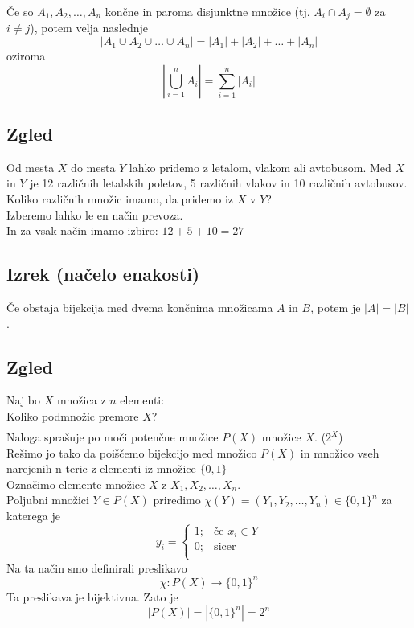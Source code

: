 \documentclass[12pt]{article}
\begin{document}
\noindent
Če so $A_1, A_2, \dots, A_n$ končne in paroma disjunktne množice (tj. $A_i \cap A_j = \emptyset$ za $i \ne j$), potem velja naslednje
$$
|A_1 \cup A_2 \cup \dots \cup A_n| = |A_1| + |A_2| + \dots + |A_n|
$$
oziroma
$$
\left| \bigcup_{i = 1}^n A_i \right| = \sum_{i = 1}^n |A_i|
$$


\subsection{Zgled}
Od mesta $X$ do mesta $Y$ lahko pridemo z letalom, vlakom ali avtobusom. Med $X$ in $Y$ je 12 različnih letalskih poletov, 5 različnih vlakov in 10 različnih avtobusov. Koliko različnih množic imamo, da pridemo iz $X$ v $Y$? \\

\noindent
Izberemo lahko le en način prevoza. \\
In za vsak način imamo izbiro: $12 + 5 + 10 = 27$



\subsection{Izrek (načelo enakosti)}
Če obstaja bijekcija med dvema končnima množicama $A$ in $B$, potem je $|A| = |B|$.


\subsection{Zgled}
Naj bo $X$ množica z $n$ elementi: \\
Koliko podmnožic premore $X$?
\begin{align*}
\end{align*}
Naloga sprašuje po moči potenčne množice $P(X)$ množice $X$. ($2^X$) \\
\noindent
Rešimo jo tako da poiščemo bijekcijo med množico $P(X)$ in množico vseh narejenih n-teric z elementi iz množice $\{0, 1\}$ \\
\noindent
Označimo elemente množice $X$ z $X_1, X_2, \dots, X_n$. \\
\noindent
Poljubni množici $Y \in P(X)$ priredimo $\chi(Y) = (Y_1, Y_2, \dots, Y_n) \in \{0, 1\}^n$ za katerega je
$$
y_i = 
\begin{cases}
    1; & \text{če } x_i \in Y \\
    0; & \text{sicer } \\
\end{cases}
$$  
Na ta način smo definirali preslikavo 
$$
\chi : P(X) \to \{0, 1\}^n
$$
Ta preslikava je bijektivna. Zato je
$$
|P(X)| = |\{0, 1\}^n| = 2^n
$$
\end{document}
